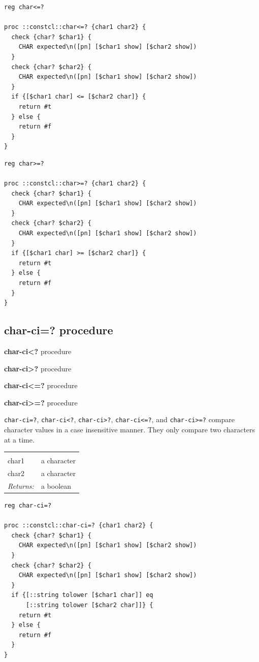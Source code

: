 \documentclass[twoside]{report}
\begin{document}
\begin{lstlisting}
reg char<=?

proc ::constcl::char<=? {char1 char2} {
  check {char? $char1} {
    CHAR expected\n([pn] [$char1 show] [$char2 show])
  }
  check {char? $char2} {
    CHAR expected\n([pn] [$char1 show] [$char2 show])
  }
  if {[$char1 char] <= [$char2 char]} {
    return #t
  } else {
    return #f
  }
}
\end{lstlisting}

\begin{lstlisting}
reg char>=?

proc ::constcl::char>=? {char1 char2} {
  check {char? $char1} {
    CHAR expected\n([pn] [$char1 show] [$char2 show])
  }
  check {char? $char2} {
    CHAR expected\n([pn] [$char1 show] [$char2 show])
  }
  if {[$char1 char] >= [$char2 char]} {
    return #t
  } else {
    return #f
  }
}
\end{lstlisting}

\subsection{char-ci=? procedure}
\label{charci-procedure}

\noindent \textbf{char-ci<?} procedure

\noindent \textbf{char-ci>?} procedure

\noindent \textbf{char-ci<=?} procedure

\noindent \textbf{char-ci>=?} procedure

\texttt{char-ci=?}, \texttt{char-ci<?}, \texttt{char-ci>?}, \texttt{char-ci<=?}, and \texttt{char-ci>=?} compare character values in a case insensitive manner. They only compare two characters at a time.

\noindent\begin{tabular}{ |p{1.9cm} p{8cm}| }
\hline
\rowcolor[HTML]{CCCCCC} \multicolumn{2}{|l|}{\bf char-ci=?, char-ci<?, char-ci>?, char-ci<=?, char-ci>=? (public)} \\
char1 & a character \\
char2 & a character \\
\textit{Returns:} & a boolean \\
\hline
\end{tabular}

\begin{lstlisting}
reg char-ci=?

proc ::constcl::char-ci=? {char1 char2} {
  check {char? $char1} {
    CHAR expected\n([pn] [$char1 show] [$char2 show])
  }
  check {char? $char2} {
    CHAR expected\n([pn] [$char1 show] [$char2 show])
  }
  if {[::string tolower [$char1 char]] eq
      [::string tolower [$char2 char]]} {
    return #t
  } else {
    return #f
  }
}
\end{lstlisting}
\end{document}

